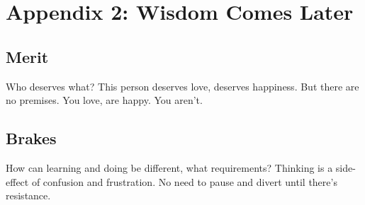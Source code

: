 \chapter{Appendix 2: Wisdom Comes Later}

\section{Merit}

Who deserves what? This person deserves love, deserves happiness. But there are no premises. You love, are happy. You aren't.

\section{Brakes}

How can learning and doing be different, what requirements? Thinking is a side-effect of confusion and frustration. No need to pause and divert until there's resistance.


